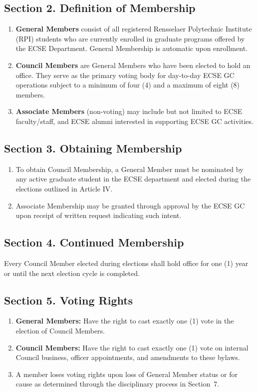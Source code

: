 \documentclass[11pt]{article}
\newcommand{\depname}{ECSE}
\newcommand{\orgshort}{ECSE GC}
\newcommand{\Sec}[1]{\subsection*{Section {#1}}}
\begin{document}
\Sec{2. Definition of Membership}
\begin{enumerate}[label=\alph*)]
    \item \textbf{General Members} consist of all registered Rensselaer Polytechnic Institute (RPI) students who are currently enrolled in graduate programs offered by the \depname{} Department. General Membership is automatic upon enrollment.
    \item \textbf{Council Members} are General Members who have been elected to hold an office. They serve as the primary voting body for day-to-day \orgshort{} operations subject to a minimum of four (4) and a maximum of eight (8) members.
    \item \textbf{Associate Members} (non-voting) may include but not limited to \depname{} faculty/staff, and \depname{} alumni interested in supporting \orgshort{} activities.
\end{enumerate}

\Sec{3. Obtaining Membership}
\begin{enumerate}[label=\alph*)]
    \item To obtain Council Membership, a General Member must be nominated by any active graduate student in the \depname{} department and elected during the elections outlined in Article IV.
    \item Associate Membership may be granted through approval by the \orgshort{} upon receipt of written request indicating such intent.
\end{enumerate}

\Sec{4. Continued Membership}
Every Council Member elected during elections shall hold office for one (1) year or until the next election cycle is completed.

\Sec{5. Voting Rights}
\begin{enumerate}[label=\alph*)]
    \item \textbf{General Members:} Have the right to cast exactly one (1) vote in the election of Council Members.
    \item \textbf{Council Members:} Have the right to cast exactly one (1) vote on internal Council business, officer appointments, and amendments to these bylaws.
    \item A member loses voting rights upon loss of General Member status or for cause as determined through the disciplinary process in Section~7.
\end{enumerate}
\end{document}
